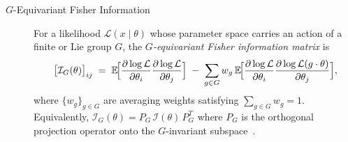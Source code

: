 \begin{description}
\item [{\(G\)-Equivariant Fisher Information}]
                For a likelihood \(\mathcal L(x\mid\theta)\) whose parameter space carries an action of a finite or Lie group \(G\), the \emph{\(G\)-equivariant Fisher information matrix} is  
                \[
                  \bigl[\mathcal I_G(\theta)\bigr]_{ij}
                  \;=\;
                  \mathbb E\!\Bigl[
                      \frac{\partial\log \mathcal L}{\partial\theta_i}
                      \frac{\partial\log \mathcal L}{\partial\theta_j}
                  \Bigr]
                  \;-\;
                  \sum_{g\in G} w_g\,
                  \mathbb E\!\Bigl[
                      \frac{\partial\log \mathcal L}{\partial\theta_i}
                      \frac{\partial\log \mathcal L(g \cdot \theta)}{\partial\theta_j}
                  \Bigr],
                \]
                where \(\{w_g\}_{g\in G}\) are averaging weights satisfying \(\sum_{g\in G}w_g=1\).  Equivalently,  
                \(\mathcal I_G(\theta)=P_G\,\mathcal I(\theta)\,P_G^{T}\) where \(P_G\) is the orthogonal projection operator onto the \(G\)-invariant subspace~\cite{nielsen_elementary_2020}.
\end{description}
